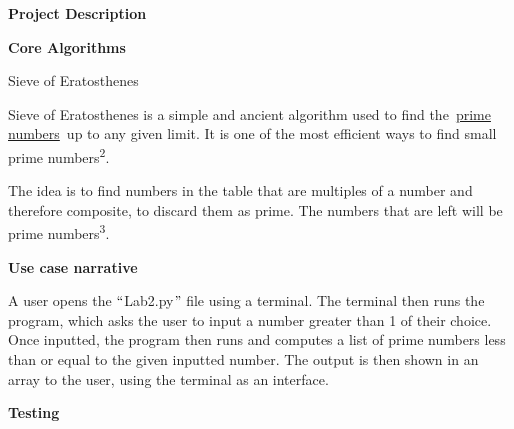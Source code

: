 \documentclass[12pt]{article}
\begin{document}
\vspace{\baselineskip}
\begin{justify}
{\fontsize{18pt}{21.6pt}\selectfont \textbf{Project Description}\par}
\end{justify}\par

\begin{justify}
\textbf{Core Algorithms}
\end{justify}\par

\begin{justify}
Sieve of Eratosthenes 
\end{justify}\par

\begin{justify}
{\fontsize{11pt}{13.2pt}\selectfont Sieve of Eratosthenes is a simple and ancient algorithm used to find the \href{https://brilliant.org/wiki/prime-numbers/}{prime numbers} up to any given limit. It is one of the most efficient ways to find small prime numbers\textsuperscript{2}.\par} The idea is to find numbers in the table that are multiples of a number and therefore composite, to discard them as prime. The numbers that are left will be prime numbers\textsuperscript{3}.
\end{justify}\par


\vspace{\baselineskip}
\begin{justify}
\textbf{Use case narrative}
\end{justify}\par

\begin{justify}
A user opens the $``$Lab2.py$"$  file using a terminal. The terminal then runs the program, which asks the user to input a number greater than 1 of their choice. Once inputted, the program then runs and computes a list of prime numbers less than or equal to the given inputted number. The output is then shown in an array to the user, using the terminal as an interface.
\end{justify}\par

\begin{justify}
{\fontsize{18pt}{21.6pt}\selectfont \textbf{Testing}\par}
\end{justify}\par
\end{document}
